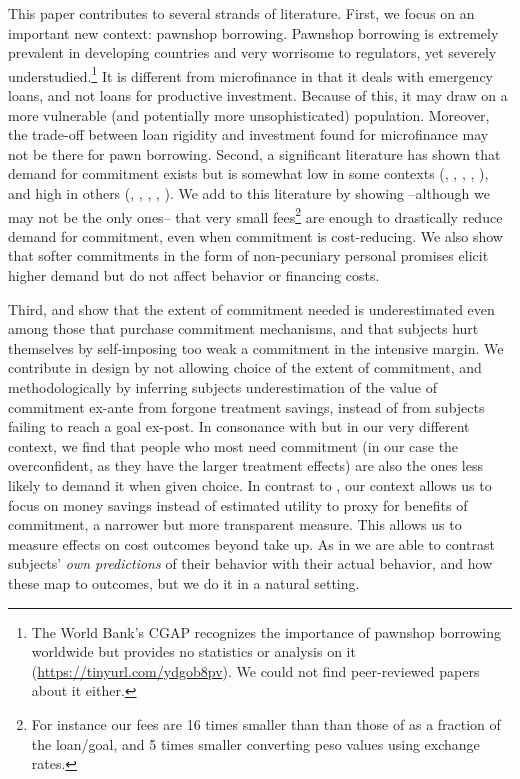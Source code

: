 \documentclass[oneside,11pt]{article}
\begin{document}
This paper contributes to several strands of literature. First, we focus on an important new context: pawnshop borrowing. Pawnshop borrowing is extremely prevalent in developing countries and very worrisome to regulators, yet severely understudied.\footnote{The World Bank's CGAP recognizes the importance of pawnshop borrowing worldwide but provides no statistics or analysis on it (\url{https://tinyurl.com/ydgob8pv}). We could not find peer-reviewed papers about it either.} It is different from microfinance in that it deals with emergency loans, and not loans for productive investment. Because of this, it may draw on a more vulnerable (and potentially more unsophisticated) population. Moreover, the trade-off between loan rigidity and investment found for microfinance \citep{Field} may not be there for pawn borrowing.  Second, a significant literature has shown that demand for commitment exists but is somewhat low in some contexts (\cite{Ashraf}, \cite{Gine}, \cite{Ted}, \cite{Royer}, \cite{Sprenger}), and high in others (\cite{Kremer},  \cite{Casaburi}, \cite{Alcohol}, \cite{AprajitP&P}, \cite{Pascaline}). We add to this literature by showing --although we may not be the only ones-- that very small fees\footnote{For instance our fees are 16 times smaller than than those of \cite{John} as a fraction of the loan/goal, and 5 times smaller converting peso values using exchange rates.} are enough to drastically reduce demand for commitment, even when commitment is cost-reducing. We also show that softer commitments in the form of non-pecuniary personal promises elicit higher demand but do not affect behavior or financing costs. 

Third, \cite{John} and \cite{Ted} show that the extent of commitment needed is underestimated even among those that purchase commitment mechanisms, and that subjects hurt themselves by self-imposing too weak a commitment in the intensive margin. We contribute in design by not allowing choice of the extent of commitment, and methodologically by inferring subjects underestimation of the value of commitment ex-ante from forgone treatment savings, instead of from subjects failing to reach a goal ex-post. In consonance with \cite{Sprenger} but in our very different context, we find that people who most need commitment (in our case the overconfident, as they have the larger treatment effects) are also the ones less likely to demand it when given choice. In contrast to \cite{Sprenger}, our context allows us to focus on money savings instead of estimated utility to proxy for benefits of commitment, a narrower but more transparent measure. This allows us to measure effects on cost outcomes beyond take up. As in \cite{Rabin2018} we are able to contrast subjects' \textit{own predictions} of their behavior with their actual behavior, and how these map to outcomes, but we do it in a natural setting.
\end{document}
